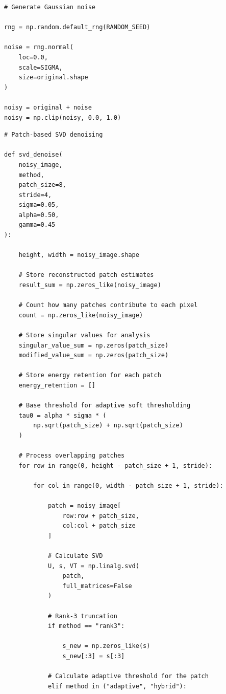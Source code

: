 \documentclass{article}
\begin{document}
\begin{flushleft}
\begin{lstlisting}[caption={Generating Gaussian noise and creating the noisy image}]
# Generate Gaussian noise

rng = np.random.default_rng(RANDOM_SEED)

noise = rng.normal(
    loc=0.0,
    scale=SIGMA,
    size=original.shape
)

noisy = original + noise
noisy = np.clip(noisy, 0.0, 1.0)
\end{lstlisting}

\begin{lstlisting}[caption={Patch-based SVD denoising function (rank-3, adaptive and hybrid 1-6-1)}]
# Patch-based SVD denoising

def svd_denoise(
    noisy_image,
    method,
    patch_size=8,
    stride=4,
    sigma=0.05,
    alpha=0.50,
    gamma=0.45
):

    height, width = noisy_image.shape

    # Store reconstructed patch estimates
    result_sum = np.zeros_like(noisy_image)

    # Count how many patches contribute to each pixel
    count = np.zeros_like(noisy_image)

    # Store singular values for analysis
    singular_value_sum = np.zeros(patch_size)
    modified_value_sum = np.zeros(patch_size)

    # Store energy retention for each patch
    energy_retention = []

    # Base threshold for adaptive soft thresholding
    tau0 = alpha * sigma * (
        np.sqrt(patch_size) + np.sqrt(patch_size)
    )

    # Process overlapping patches
    for row in range(0, height - patch_size + 1, stride):

        for col in range(0, width - patch_size + 1, stride):

            patch = noisy_image[
                row:row + patch_size,
                col:col + patch_size
            ]

            # Calculate SVD
            U, s, VT = np.linalg.svd(
                patch,
                full_matrices=False
            )

            # Rank-3 truncation
            if method == "rank3":

                s_new = np.zeros_like(s)
                s_new[:3] = s[:3]

            # Calculate adaptive threshold for the patch
            elif method in ("adaptive", "hybrid"):


\end{lstlisting}
\end{flushleft}
\end{document}
